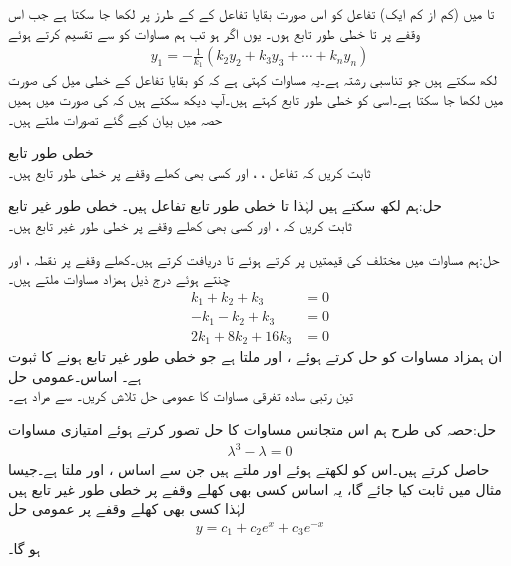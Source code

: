  تا  میں (کم از کم ایک) تفاعل کو اس صورت بقایا تفاعل کے  کے طرز پر لکھا جا سکتا ہے جب اس وقفے پر  تا  خطی طور تابع ہوں۔ یوں اگر  ہو تب ہم مساوات  کو  سے تقسیم کرتے ہوئے
\begin{align*}
y_1=-\frac{1}{k_1}(k_2 y_2+k_3y_3+\cdots+k_ny_n)
\end{align*}
 لکھ سکتے ہیں جو تناسبی رشتہ ہے۔یہ مساوات کہتی ہے کہ  کو بقایا تفاعل کے خطی میل کی صورت میں لکھا جا سکتا ہے۔اسی کو خطی طور تابع کہتے ہیں۔آپ دیکھ سکتے ہیں کہ  کی صورت میں ہمیں حصہ  میں بیان کیے گئے تصورات ملتے ہیں۔

\quad خطی طور تابع\\
ثابت کریں کہ تفاعل ، ،  اور  کسی بھی کھلے وقفے پر خطی طور تابع ہیں۔

حل:ہم  لکھ سکتے ہیں لہٰذا  تا  خطی طور تابع تفاعل ہیں۔
\quad خطی طور غیر تابع\\
ثابت کریں کہ ،  اور   کسی بھی کھلے وقفے پر خطی طور غیر تابع ہیں۔

حل:ہم  مساوات  میں مختلف  کی قیمتیں پر کرتے ہوئے  تا  دریافت کرتے ہیں۔کھلے وقفے پر نقطہ ،  اور  چنتے ہوئے درج ذیل ہمزاد مساوات ملتے ہیں۔
\begin{align*}
k_1+k_2+k_3&=0\\
-k_1-k_2+k_3&=0\\
2k_1+8k_2+16k_3&=0
\end{align*}
ان ہمزاد مساوات کو حل کرتے ہوئے ،  اور  ملتا ہے جو خطی طور غیر تابع ہونے کا ثبوت ہے۔
\quad اساس۔عمومی حل\\
تین رتبی سادہ تفرقی مساوات  کا عمومی حل تلاش کریں۔  سے مراد  ہے۔

حل:حصہ  کی طرح ہم اس متجانس مساوات کا حل  تصور کرتے  ہوئے امتیازی مساوات
\begin{align*}
\lambda^3-\lambda=0
\end{align*}
حاصل کرتے ہیں۔اس کو  لکھتے ہوئے  اور  ملتے ہیں جن سے اساس ،  اور  ملتا ہے۔جیسا مثال  میں ثابت کیا جائے گا، یہ اساس کسی بھی کھلے وقفے پر خطی طور غیر تابع ہیں لہٰذا کسی بھی کھلے وقفے پر  عمومی حل 
\begin{align*}
y=c_1+c_2e^x+c_3e^{-x}
\end{align*}
ہو گا۔


